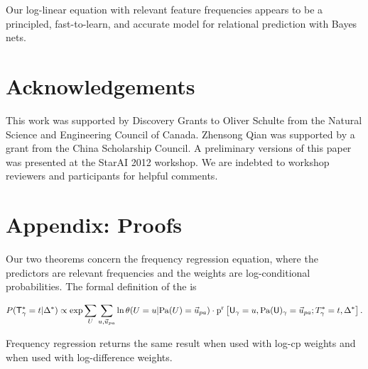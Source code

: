 \documentclass[twoside,11pt]{article}
\begin{document}
Our log-linear equation with relevant feature frequencies appears to be a principled, fast-to-learn, and accurate model for relational prediction with Bayes nets.




\section*{Acknowledgements} This work was supported by Discovery Grants to Oliver Schulte from the Natural Science and Engineering Council of Canada. Zhensong Qian was supported by a grant from the China Scholarship Council. A preliminary versions of this paper was presented at the StarAI 2012 workshop. We are indebted to workshop reviewers and participants for helpful comments.

\section*{Appendix: Proofs} \label{app:proofs}

Our two theorems concern the frequency regression equation, where the predictors are relevant frequencies and the weights are log-conditional probabilities. The formal definition of the  is



\begin{eqnarray} 
  \Gprob{\FG{\Ground{\TI}} = \TV} {\QC} \propto  \exp  \sum_{\UT} \sum_{\UV,\Prange{\UT}}   \ln \cprob{\UT = \UV}{\Pa{\UT} = \Prange{\UT}}      \cdot 
    \Relfreq{\Appendterm{\Ground{\UI}  = \UV} {\Ground{\Pa{\UI}} = \Prange{\UT}}} {\Qconj} \label{eq:frequency}.
\end{eqnarray}



\begin{proposition}
Frequency regression returns the same result when used with log-cp weights and when used with log-difference weights.
\end{proposition}
\end{document}
